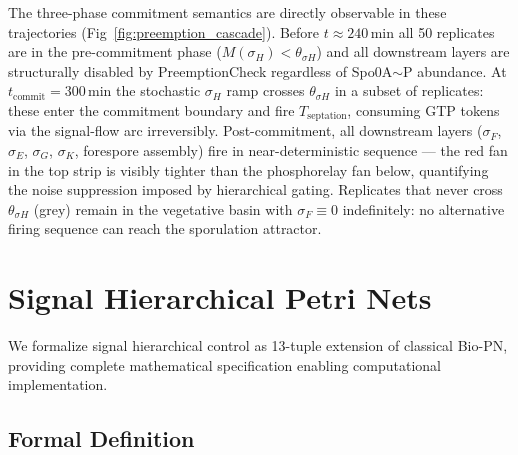 \documentclass[10pt,letterpaper]{article}
\begin{document}
The three-phase commitment semantics are directly observable in these trajectories (Fig~\ref{fig:preemption_cascade}).
Before $t \approx 240\,\mathrm{min}$ all 50 replicates are in the pre-commitment phase ($M(\sigma_H) < \theta_{\sigma H}$) and all downstream layers are structurally disabled by PreemptionCheck regardless of Spo0A$\sim$P abundance.
At $t_\mathrm{commit} = 300\,\mathrm{min}$ the stochastic $\sigma_H$ ramp crosses $\theta_{\sigma H}$ in a subset of replicates: these enter the commitment boundary and fire $T_{\mathrm{septation}}$, consuming GTP tokens via the signal-flow arc irreversibly.
Post-commitment, all downstream layers ($\sigma_F$, $\sigma_E$, $\sigma_G$, $\sigma_K$, forespore assembly) fire in near-deterministic sequence — the red fan in the top strip is visibly tighter than the phosphorelay fan below, quantifying the noise suppression imposed by hierarchical gating.
Replicates that never cross $\theta_{\sigma H}$ (grey) remain in the vegetative basin with $\sigma_F \equiv 0$ indefinitely: no alternative firing sequence can reach the sporulation attractor.

\FloatBarrier
\section{Signal Hierarchical Petri Nets}

We formalize signal hierarchical control as 13-tuple extension of classical Bio-PN, providing complete mathematical specification enabling computational implementation.

\subsection{Formal Definition}
\end{document}
